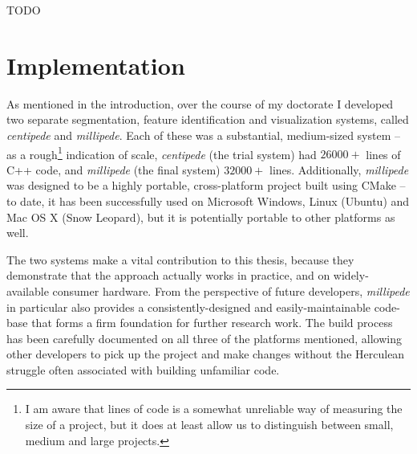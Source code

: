 TODO

\iffalse
+ The feature identifiers are relatively quick to run
+ The 2D ribs identifier is relatively effective, although it can miss ribs in some cases
+ The 2D spine identifier is effective and robust (about 85%
+ The 3D spine identifier is relatively effective and robust, but has a tendency to flood into the ribs a bit
+ The 3D spinal canal identifier is relatively effective and robust, although the contour of the spinal canal is by no means perfect yet
+ The 3D kidneys identifier is a reasonable start, but requires further work both to make it more robust and to detect kidneys that are made up of multiple regions 
- Because the current techniques are based on region growing, they suffer from the usual sort of region growing problems; a better approach might be to use the partition forest to find initial features, and then use level sets
- The 3D aorta identifier only works well when the segmentation is particularly good; it needs further work
- The 3D liver identifier is not ideal (although it does start out in the right place), and has a tendency to flood into other features
\fi

\section{Implementation}

As mentioned in the introduction, over the course of my doctorate I developed two separate segmentation, feature identification and visualization systems, called \emph{centipede} and \emph{millipede}. Each of these was a substantial, medium-sized system -- as a rough\footnote{I am aware that lines of code is a somewhat unreliable way of measuring the size of a project, but it does at least allow us to distinguish between small, medium and large projects.} indication of scale, \emph{centipede} (the trial system) had $26000+$ lines of C++ code, and \emph{millipede} (the final system) $32000+$ lines. Additionally, \emph{millipede} was designed to be a highly portable, cross-platform project built using CMake -- to date, it has been successfully used on Microsoft Windows, Linux (Ubuntu) and Mac OS X (Snow Leopard), but it is potentially portable to other platforms as well.

The two systems make a vital contribution to this thesis, because they demonstrate that the approach actually works in practice, and on widely-available consumer hardware. From the perspective of future developers, \emph{millipede} in particular also provides a consistently-designed and easily-maintainable code-base that forms a firm foundation for further research work. The build process has been carefully documented on all three of the platforms mentioned, allowing other developers to pick up the project and make changes without the Herculean struggle often associated with building unfamiliar code.

